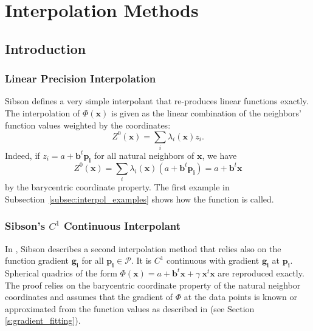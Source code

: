 \section{Interpolation Methods\label{sec:interpolation}}
\subsection{Introduction}
\subsubsection{Linear Precision Interpolation}

Sibson \cite{s-bdnni-81} defines a very simple interpolant that
re-produces linear functions exactly. The interpolation of
$\Phi(\mathbf{x})$ is given as the linear combination of the neighbors' function
values weighted by the coordinates:
\begin{displaymath}
  Z^0(\mathbf{x}) = \sum_i  \lambda_i(\mathbf{x}) z_i.
\end{displaymath}
Indeed, if $z_i=a + \mathbf{b}^t \mathbf{p_i}$ for all natural
neighbors of $\mathbf{x}$, we have
\[  Z^0(\mathbf{x}) = \sum_i  \lambda_i(\mathbf{x}) (a + \mathbf{b}^t\mathbf{p_i}) = a+\mathbf{b}^t \mathbf{x}\]
by the barycentric coordinate property. The first example in
Subsection~\ref{subsec:interpol_examples} shows how the function is
called.

\subsubsection{Sibson's $C^1$ Continuous Interpolant}
In \cite{s-bdnni-81}, Sibson describes a second interpolation method
that relies also on the function gradient $\mathbf{g_i}$ for all $\mathbf{p_i} \in \mathcal{P}$. It is $C^1$ continuous with gradient $\mathbf{g_i}$ at
$\mathbf{p_i}$. Spherical quadrics of the form $\Phi(\mathbf{x}) =a +
\mathbf{b}^t \mathbf{x} +\gamma\ \mathbf{x}^t\mathbf{x}$ are reproduced 
exactly. The
proof relies on the barycentric coordinate property of the natural
neighbor coordinates and assumes that the gradient of $\Phi$ at the
data points is known or approximated from the function values as
described in \cite{s-bdnni-81} (see Section \ref{s:gradient_fitting}). 


